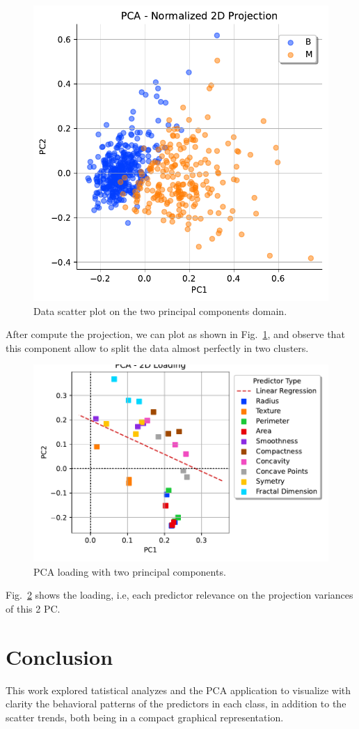 \documentclass[conference]{IEEEtran}
\begin{document}
\begin{figure}[htbp]
    \centerline{\includegraphics[width=0.5 \textwidth]{../../code/hw1/figures/5-2-PCA-2D-scatter.pdf}}
    \caption{Data scatter plot on the two principal components domain.}
    \label{fig:5-2-PCA-2D-scatter}
\end{figure}

After compute the projection, we can plot as shown in Fig.~\ref{fig:5-2-PCA-2D-scatter}, and observe that this component allow to split the data almost perfectly in two clusters.

\begin{figure}[htbp]
    \centerline{\includegraphics[width=0.5 \textwidth]{../../code/hw1/figures/5-2-PCA-2D-loading.pdf}}
    \caption{PCA loading with two principal components.}
    \label{fig:5-2-PCA-2D-loading}
\end{figure}

Fig.~\ref{fig:5-2-PCA-2D-loading} shows the loading, i.e, each predictor relevance on the projection variances of this 2 PC.

\section{Conclusion}

This work explored tatistical analyzes and the PCA application to visualize with clarity the behavioral patterns of the predictors in each class, in addition to the scatter trends, both being in a compact graphical representation. 
\end{document}
